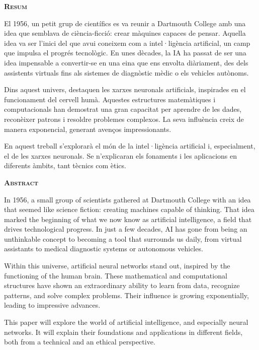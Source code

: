 

\begin{modernquote}
\textsc{\textbf{Resum}}\par
{}
\raggedright
El 1956, un petit grup de científics es va reunir a Dartmouth College amb una idea que semblava de ciència-ficció: crear màquines capaces de pensar. Aquella idea va ser l'inici del que avui coneixem com a intel·ligència artificial, un camp que impulsa el progrés tecnològic. En unes dècades, la IA ha passat de ser una idea impensable a convertir-se en una eina que ens envolta diàriament, des dels assistents virtuals fins als sistemes de diagnòstic mèdic o els vehicles autònoms.\par

Dins aquest univers, destaquen les xarxes neuronals artificials, inspirades en el funcionament del cervell humà. Aquestes estructures matemàtiques i computacionals han demostrat una gran capacitat per aprendre de les dades, reconèixer patrons i resoldre problemes complexos. La seva influència creix de manera exponencial, generant avenços impressionants.\par

En aquest treball s'explorarà el món de la intel·ligència artificial i, especialment, el de les xarxes neuronals. Se n'explicaran els fonaments i les aplicacions en diferents àmbits, tant tècnics com ètics.
\end{modernquote}

\bigskip

\begin{modernquote}
\textsc{\textbf{Abstract}}\par
{}
\raggedright
In 1956, a small group of scientists gathered at Dartmouth College with an idea that seemed like science fiction: creating machines capable of thinking. That idea marked the beginning of what we now know as artificial intelligence, a field that drives technological progress. In just a few decades, AI has gone from being an unthinkable concept to becoming a tool that surrounds us daily, from virtual assistants to medical diagnostic systems or autonomous vehicles.\par

Within this universe, artificial neural networks stand out, inspired by the functioning of the human brain. These mathematical and computational structures have shown an extraordinary ability to learn from data, recognize patterns, and solve complex problems. Their influence is growing exponentially, leading to impressive advances.\par

This paper will explore the world of artificial intelligence, and especially neural networks. It will explain their foundations and applications in different fields, both from a technical and an ethical perspective.
\end{modernquote}


